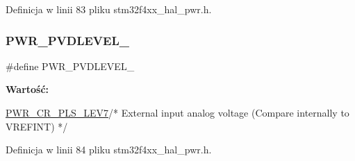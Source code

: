 Definicja w linii 83 pliku stm32f4xx\+\_\+hal\+\_\+pwr.\+h.

\mbox{\label{group___p_w_r___p_v_d__detection__level_ga2c5cd8dd26b13bdf0164c1f7596b4bfd}} 
\subsubsection{\texorpdfstring{P\+W\+R\+\_\+\+P\+V\+D\+L\+E\+V\+E\+L\+\_}{PWR\_PVDLEVEL\_7}}
{\footnotesize\ttfamily \#define P\+W\+R\+\_\+\+P\+V\+D\+L\+E\+V\+E\+L\+\_}

{\bfseries Wartość\+:}
\begin{DoxyCode}
\hyperlink{group___peripheral___registers___bits___definition_ga95e3b301b5470ae94d32c53a9fbdfc8b}{PWR\_CR\_PLS\_LEV7}\textcolor{comment}{/* External input analog voltage }
\textcolor{comment}{                                                          (Compare internally to VREFINT) */}
\end{DoxyCode}


Definicja w linii 84 pliku stm32f4xx\+\_\+hal\+\_\+pwr.\+h.

